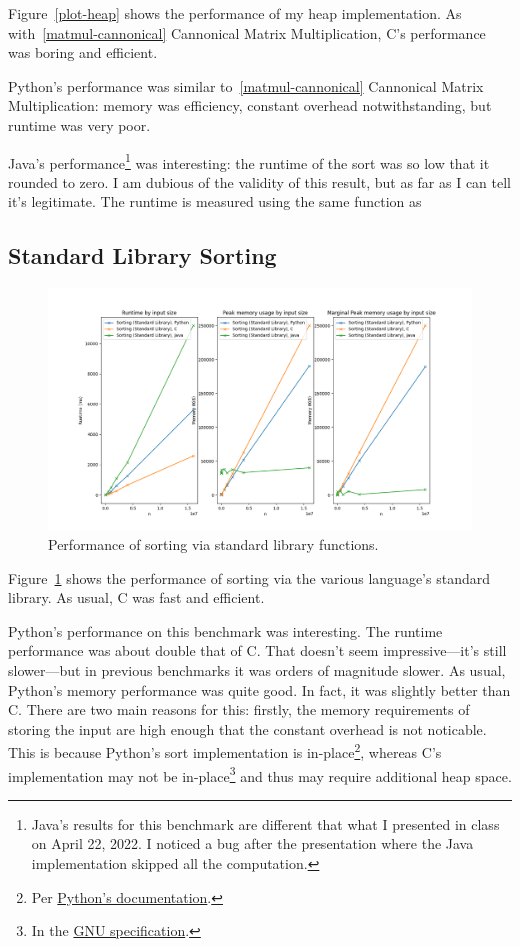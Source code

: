 \documentclass[12pt,letterpaper]{article}
\begin{document}
Figure~\ref{plot-heap} shows the performance of my heap implementation. As
with~\ref{matmul-cannonical} Cannonical Matrix Multiplication, C's performance
was boring and efficient.

Python's performance was similar to~\ref{matmul-cannonical} Cannonical Matrix
Multiplication: memory was efficiency, constant overhead notwithstanding, but
runtime was very poor.

Java's performance\footnote{Java's results for this benchmark are different
that what I presented in class on April 22, 2022. I noticed a bug after the
presentation where the Java implementation skipped all the computation.} was
interesting: the runtime of the sort was so low that it rounded to zero. I am
dubious of the validity of this result, but as far as I can tell it's
legitimate. The runtime is measured using the same function as


\subsection{Standard Library Sorting}\label{sort}

\begin{figure}[h!]
  \centering
  \includegraphics[width=\textwidth]{./sort_stdlib-plot.png}
  \caption{Performance of sorting via standard library functions.}
  \label{plot-sort}
\end{figure}

Figure~\ref{plot-sort} shows the performance of sorting via the various
language's standard library.  As usual, C was fast and efficient.

Python's performance on this benchmark was interesting. The runtime performance
was about double that of C. That doesn't seem impressive—it's still slower—but
in previous benchmarks it was orders of magnitude slower. As usual, Python's
memory performance was quite good. In fact, it was slightly better than C.
There are two main reasons for this: firstly, the memory requirements of
storing the input are high enough that the constant overhead is not noticable.
This is because Python's sort implementation is in-place\footnote{Per
\href{https://docs.python.org/3/library/stdtypes.html#list.sort}{Python's
documentation}.}, whereas C's implementation may not be in-place\footnote{In
the
\href{https://www.gnu.org/software/libc/manual/html_node/Array-Sort-Function.html}{GNU
specification}.} and thus may require additional heap space.
\end{document}
